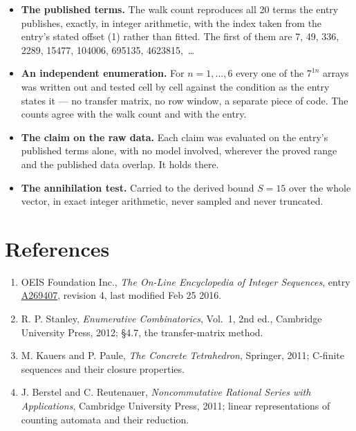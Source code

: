 \documentclass[11pt]{article}
\theoremstyle{definition}
\begin{document}
\begin{itemize}

\item {\bfseries The published terms.} The walk count reproduces all 20 terms the entry publishes, exactly, in integer arithmetic, with the index taken from the entry's stated offset (1) rather than fitted. The first of them are 7, 49, 336, 2289, 15477, 104006, 695135, 4623815,~\dots

\item {\bfseries An independent enumeration.} For $n = 1,\dots,6$ every one of the $7^{1n}$ arrays was written out and tested cell by cell against the condition as the entry states it --- no transfer matrix, no row window, a separate piece of code. The counts agree with the walk count and with the entry.

\item {\bfseries The claim on the raw data.} Each claim was evaluated on the entry's published terms alone, with no model involved, wherever the proved range and the published data overlap. It holds there.

\item {\bfseries The annihilation test.} Carried to the derived bound $S = 15$ over the whole vector, in exact integer arithmetic, never sampled and never truncated.

\end{itemize}

\section{References}

\begin{enumerate}

\item OEIS Foundation Inc., \emph{The On-Line Encyclopedia of Integer Sequences}, entry \href{https://oeis.org/A269407}{A269407}, revision 4, last modified Feb 25 2016.

\item R. P. Stanley, \emph{Enumerative Combinatorics}, Vol.~1, 2nd ed., Cambridge University Press, 2012; \S4.7, the transfer-matrix method.

\item M. Kauers and P. Paule, \emph{The Concrete Tetrahedron}, Springer, 2011; C-finite sequences and their closure properties.

\item J. Berstel and C. Reutenauer, \emph{Noncommutative Rational Series with Applications}, Cambridge University Press, 2011; linear representations of counting automata and their reduction.

\end{enumerate}
\end{document}

